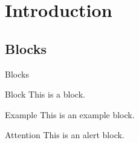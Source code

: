 \section{Introduction}
\subsection{Blocks}
\begin{frame}{Blocks}
  \begin{block}{Block}
    This is a block.
  \end{block}
  \begin{exampleblock}{Example}
    This is an example block.
  \end{exampleblock}
  \begin{alertblock}{Attention}
    This is an alert block.
  \end{alertblock}
\end{frame}